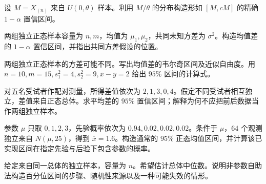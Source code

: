 \begin{exercise}[均匀端点的单侧区间]\label{q:B13.2}
设 $M=X_{(n)}$ 来自 $U(0,\theta)$ 样本。利用 $M/\theta$ 的分布构造形如 $[M,cM]$ 的精确 $1-\alpha$ 置信区间。\par{}\end{exercise}

\begin{exercise}[两个均值差的合并方差区间]\label{q:B13.3}
两组独立正态样本容量为 $n,m$，均值为 $\mu_1,\mu_2$，共同未知方差为 $\sigma^2$。构造均值差的 $1-\alpha$ 置信区间，并指出共同方差假设的位置。\par{}\end{exercise}

\begin{exercise}[韦尔奇近似区间]\label{q:B13.4}
两组独立正态样本的方差可能不同。写出均值差的韦尔奇区间及近似自由度。用 $n=10,m=15,s_1^2=4,s_2^2=9,\overline x-\overline y=2$ 给出 $95\%$ 区间的计算式。\par{}\end{exercise}

\begin{exercise}[配对差的区间]\label{q:B13.5}
对五名受试者作配对测量，所得差值依次为 $2,1,3,0,4$。假定不同受试者相互独立，差值来自正态总体。求平均差的 $95\%$ 置信区间；解释为何不应把前后数据当作两组独立样本。\par{}\end{exercise}

\begin{exercise}[置信区间与后验区间不能互换]\label{q:M-P10-5}
参数 $\mu$ 只取 $0,1,2,3$，先验概率依次为 $0.94,0.02,0.02,0.02$。条件于 $\mu$，$64$ 个观测独立来自 $N(\mu,25)$，得到 $\overline x=1.6$。构造通常的 $95\%$ 正态均值区间，并计算该已实现区间在指定先验与后验下包含参数的概率。\par{}\end{exercise}

\begin{exercise}[自助法百分位区间]\label{q:B13.6}
给定来自同一总体的独立样本，容量为 $n$。希望估计总体中位数。说明非参数自助法构造百分位区间的步骤、随机性来源以及一种可能失效的情形。\par{}\end{exercise}

